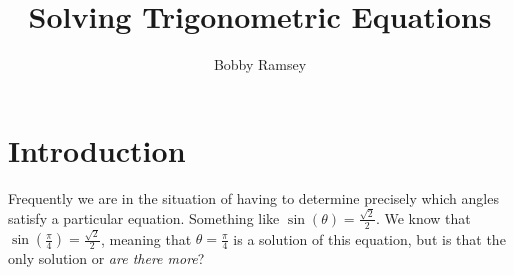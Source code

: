 \documentclass[nooutcomes]{ximera}
\author{Bobby Ramsey}
\title{Solving Trigonometric Equations}
\begin{document}
\begin{abstract}
	
\end{abstract}
\maketitle




\section{Introduction}

Frequently we are in the situation of having to determine precisely which angles satisfy a particular equation. Something like $\sin(\theta) = \frac{\sqrt{2}}{2}$. We know that $\sin\left( \frac{\pi}{4} \right) = \frac{\sqrt{2}}{2}$, meaning that $\theta = \frac{\pi}{4}$ is a solution of this equation, but is that the only solution or \emph{are there more}?
\end{document}
